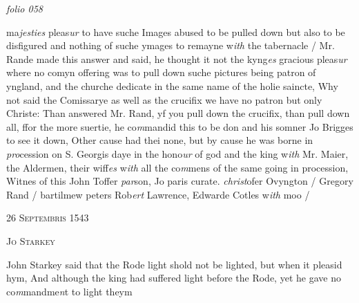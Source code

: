 \documentclass[12pt, a4paper]{book}
\begin{document}
\textit{folio 058}



				\marginpar[\vspace{0.5cm}{\textcolor{Gray}{n}}]{}
			
	
		\ifthenelse{\isodd{\thepage}}
		{\reversemarginpar}
		{\normalmarginpar}
		
ma\textit{jesties} pleas\textit{ur} to have suche Images abused to be
 pulled down but also to be disfigured and nothing
 of suche ymages to remayne w\textit{ith} the tabernacle / Mr.
 Rande made this answer and said, he thought it not
 the kyng\textit{es} gracious pleas\textit{ur }where no comyn offering
 was to pull down suche pictures being patron of
 yngland, and the churche dedicate in the same name
 of the holie saincte, Why not said the Comissarye as
 well as the crucifix we have no patron but only
 Christe: Than answered Mr. Rand, yf you pull
 down the crucifix, than pull down all, ffor the
 more suertie, he co\textit{m}mandid this to be don and his
		somner Jo Brigges to see it down, Other cause
 had thei none, but by cause he was borne in \textit{pro}cession
  on S. Georgis daye in the hono\textit{ur} of god and the king
		w\textit{ith} Mr. Maier, the Aldermen, their wiff\textit{es} w\textit{ith} all
 the co\textit{m}mens of the same going in procession, Witnes
		of this John Toffer \textit{par}son, Jo paris curate.\textit{ christ}ofer
			Ovyngton / Gregory Rand / bartilmew peters
		Rob\textit{ert }Lawrence, Edwarde Cotles w\textit{ith} moo /

 

            
            
               
				\begin{center} \begin{large} {\scshape 
               	26 Septembris 1543
               } \end{large} \end{center}
			
               
               	
				\begin{center}  {\scshape Jo Starkey}  \end{center}
			
               	
				\marginpar[\vspace{0.5cm}{\textcolor{Gray}{Ceremony}}]{}
			
               		
		\ifthenelse{\isodd{\thepage}}
		{\reversemarginpar}
		{\normalmarginpar}
		John Starkey said that the Rode light shold not be
  lighted, but when it pleasid hym, And although
 the king had suffered light before the Rode, yet he
 gave no co\textit{m}mandme\textit{n}t to light theym
               	
\end{document}
